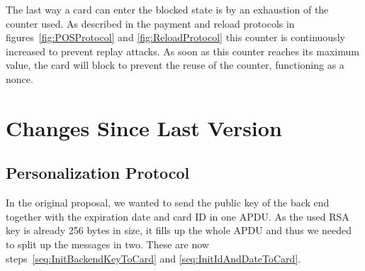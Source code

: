 \documentclass{article}
\begin{document}
The last way a card can enter the blocked state is by an exhaustion of the counter used.
As described in the payment and reload protocols in figures~\ref{fig:POSProtocol} and \ref{fig:ReloadProtocol} this counter is continuously increased to prevent replay attacks.
As soon as this counter reaches its maximum value, the card will block to prevent the reuse of the counter, functioning as a nonce.

\section{Changes Since Last Version}
    \subsection{Personalization Protocol}
    In the original proposal, we wanted to send the public key of the back end together with the expiration date and card ID in one APDU.
    As the used RSA key is already 256 bytes in size, it fills up the whole APDU and thus we needed to split up the messages in two.
    These are now steps~\ref{seq:InitBackendKeyToCard} and \ref{seq:InitIdAndDateToCard}.
\end{document}

